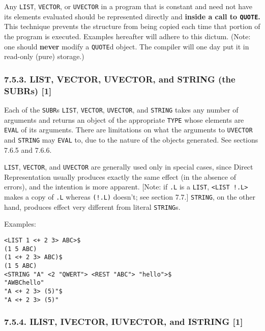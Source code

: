\documentclass[a4paper,]{article}
\begin{document}
Any \texttt{LIST}, \texttt{VECTOR}, or \texttt{UVECTOR}
in a program that is constant and need not have its elements evaluated should be represented directly and \textbf{inside a
call to \texttt{QUOTE}.} This technique prevents the structure from being copied each time that portion of the program is
executed. Examples hereafter will adhere to this dictum. (Note: one should \textbf{never} modify a \texttt{QUOTE}d object.
The compiler will one day put it in read-only (pure) storage.)

\subsubsection{7.5.3. LIST, VECTOR, UVECTOR, and STRING (the SUBRs)
{[}1{]}}\label{list-vector-uvector-and-string-the-subrs-1}

Each of the \texttt{SUBR}s \texttt{LIST}, \texttt{VECTOR},
\texttt{UVECTOR}, and \texttt{STRING} takes any number of
arguments and returns an object of the appropriate \texttt{TYPE} whose elements are \texttt{EVAL} of its arguments. There
are limitations on what the arguments to \texttt{UVECTOR} and \texttt{STRING} may \texttt{EVAL} to, due to the nature of
the objects generated. See sections 7.6.5 and 7.6.6.

\texttt{LIST}, \texttt{VECTOR}, and \texttt{UVECTOR} are generally used only in special cases, since Direct Representation
usually produces exactly the same effect (in the absence of errors), and the intention is more apparent. {[}Note: if
\texttt{.L} is a \texttt{LIST}, \texttt{\textless{}LIST\ !.L\textgreater{}} makes a copy of \texttt{.L} whereas
\texttt{(!.L)} doesn't; see section 7.7.{]} \texttt{STRING}, on the other hand, produces effect very different from literal
\texttt{STRING}s.

Examples:

\begin{verbatim}
<LIST 1 <+ 2 3> ABC>$
(1 5 ABC)
(1 <+ 2 3> ABC)$
(1 5 ABC)
<STRING "A" <2 "QWERT"> <REST "ABC"> "hello">$
"AWBChello"
"A <+ 2 3> (5)"$
"A <+ 2 3> (5)"
\end{verbatim}

\subsubsection{7.5.4. ILIST, IVECTOR, IUVECTOR, and ISTRING {[}1{]}}\label{ilist-ivector-iuvector-and-istring-1}
\end{document}
